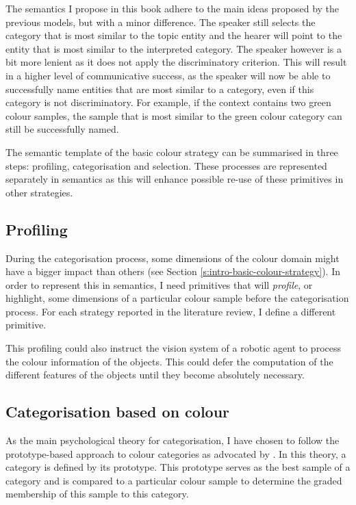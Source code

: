 The semantics I propose in this book adhere to the main ideas
proposed by the previous models, but with a minor difference. The
speaker still selects the category that is most similar to the topic
entity and the hearer will point to the entity that is most similar to
the interpreted category. The speaker however is a bit more lenient as
it does not apply the discriminatory criterion. This will result in a
higher level of communicative success, as the speaker will now be able
to successfully name entities that are most similar to a category,
even if this category is not discriminatory. For example, if the
context contains two green colour samples, the sample that is most
similar to the green colour category can still be successfully
named. 

The semantic template of the basic colour strategy can be
summarised in three steps: profiling, categorisation and
selection. These processes are represented separately in semantics as
this will enhance possible re-use of these primitives in other
strategies.

\subsection{Profiling}

During the categorisation process, some dimensions of the colour
domain might have a bigger impact than others (see Section
\ref{s:intro-basic-colour-strategy}). In order to represent this in
semantics, I need primitives that will \emph{profile}, or highlight,
some dimensions of a particular colour sample before the
categorisation process. For each strategy reported in the literature
review, I define a different primitive.

This profiling could also instruct the vision system of a robotic
agent to process the colour information of the objects. This could
defer the computation of the different features of the objects until
they become absolutely necessary.

\subsection{Categorisation based on colour}
\label{s:bcs-categorisation}

As the main psychological theory for categorisation, I have chosen to
follow the prototype-based approach to colour categories as advocated
by \cite{rosch73natural}. In this theory, a category is defined by its
prototype. This prototype serves as the best sample of a category and
is compared to a particular colour sample to determine the graded
membership of this sample to this category.


